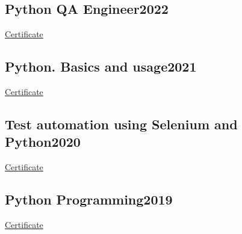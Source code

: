 \vspace*{10pt}

\subsection {{Python QA Engineer}\hfill 2022}
\vspace*{5pt}
\href{https://otus.ru/certificate/76b8da1ae26847fdab5ddfbc06c0ca59/en/}{Certificate}

\vspace*{6pt}

\subsection{{Python. Basics and usage}\hfill 2021}
\vspace*{5pt}
\href{https://stepik.org/cert/1234026/}{Certificate}

\vspace*{6pt}

\subsection{{Test automation using Selenium and Python}\hfill 2020}
\vspace*{5pt}
\href{https://stepik.org/cert/303434}{Certificate}

\vspace*{6pt}

\subsection{{Python Programming}\hfill 2019}
\vspace*{5pt}
\href{https://stepik.org/cert/268482}{Certificate}
